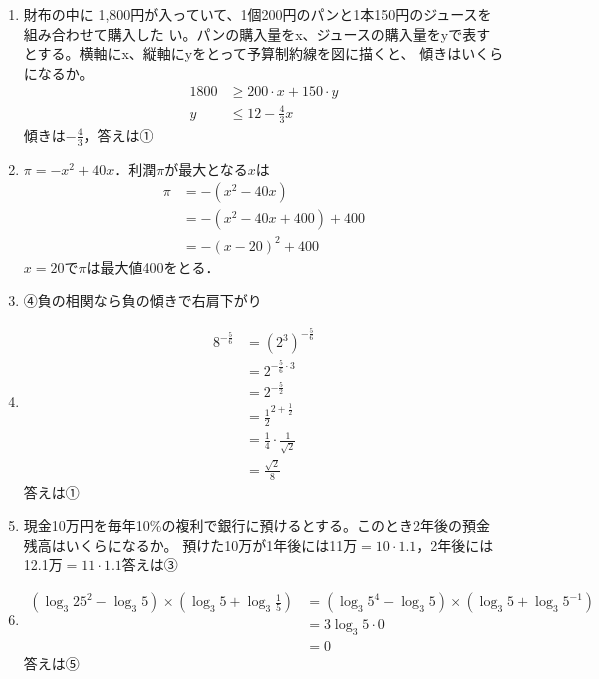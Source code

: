 \documentclass{ltjsarticle}
\begin{document}
\begin{enumerate}
  \item[設問2] 財布の中に 1,800円が入っていて、1個200円のパンと1本150円のジュースを組み合わせて購入した
  い。パンの購入量をx、ジュースの購入量をyで表すとする。横軸にx、縦軸にyをとって予算制約線を図に描くと、
  傾きはいくらになるか。
  \begin{align*}
    1800 &\ge 200\cdot x + 150\cdot y \\
    y &\le 12 - \frac{4}{3}x  
  \end{align*}
  傾きは$-\frac{4}{3}$，答えは①

  \item [設問5, 6] $\pi = -x^2+40x$．利潤$\pi$が最大となる$x$は
  \begin{align*}
    \pi &= -(x^2-40x) \\
    &= -(x^2-40x+400)+400 \\
    &= -(x-20)^2+400 
  \end{align*}
  $x=20$で$\pi$は最大値400をとる．

  \item [設問7] ④負の相関なら負の傾きで右肩下がり
  
  \item [設問8]
  \begin{align*}
    8^{-\frac{5}{6}} &= (2^3)^{-\frac{5}{6}} \\
    &= 2^{-\frac{5}{6}\cdot 3} \\
    &= 2^{-\frac{5}{2}} \\
    &= \frac{1}{2}^{2+\frac{1}{2}} \\
    &= \frac{1}{4}\cdot \frac{1}{\sqrt{2}} \\
    &= \frac{\sqrt{2}}{8}
  \end{align*}
  答えは①

  \item [設問9]  現金10万円を毎年10\%の複利で銀行に預けるとする。このとき2年後の預金残高はいくらになるか。
  預けた10万が1年後には11万$=10\cdot 1.1$，2年後には12.1万$=11\cdot 1.1$答えは③

  \item [設問10] 
  \begin{align*}
    (\log_3 25^2 - \log_3 5) \times (\log_3 5 + \log_3 \frac{1}{5}) &= (\log_3 5^4 - \log_3 5) \times (\log_3 5 + \log_3 5^{-1}) \\
    &= 3\log_3 5 \cdot 0 \\
    &= 0
  \end{align*}
  答えは⑤


\end{enumerate}
\end{document}
